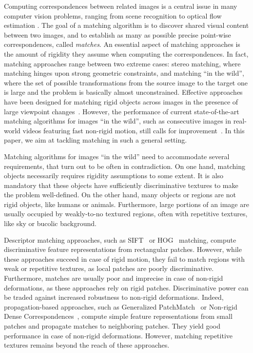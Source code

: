 \documentclass[twocolumn,natbib]{svjour3}
\begin{document}
Computing correspondences between related images is a central issue in many
computer vision problems, ranging from scene recognition to optical
flow estimation \citep{forsyth2011computer,Szeliski2010}. 
The goal of a matching algorithm is to discover shared visual content 
between two images, and 
to establish as many as possible precise point-wise correspondences, called \emph{matches}. 
An essential
aspect of matching approaches is the amount of rigidity they assume
when computing the correspondences.  In fact, matching
approaches range between two extreme cases:  stereo matching, where
matching hinges upon strong geometric constraints, 
and matching ``in the wild'', where the set of possible
transformations from the source image to the target one  is large and the
problem is basically almost unconstrained. 
Effective approaches have
been designed for matching rigid objects across images in the presence
of  large viewpoint changes~\citep{Lowe2004,Barnes2010,HaCohen2011}.
However, the performance of current state-of-the-art matching
algorithms for images ``in the wild'', such as consecutive images in
real-world videos featuring fast non-rigid motion, still calls for
improvement~\citep{mdpof,Chen2013}.   
In this paper, we aim at tackling matching in such a general setting. 


Matching algorithms for images ``in the wild'' need to accommodate several requirements, that turn out to be often in contradiction. On one hand,
matching objects necessarily requires rigidity assumptions to some extent. 
It is also mandatory that these objects have sufficiently discriminative textures to make the problem well-defined. 
On the other hand, 
many objects or regions are not rigid objects, like humans or animals. Furthermore, large portions of an image
are usually occupied by weakly-to-no textured regions, often with repetitive textures, like sky or bucolic background.

Descriptor matching approaches, such as SIFT~\citep{Lowe2004}
or HOG~\citep{Dalal2005,Bro11a} matching, compute discriminative feature representations from rectangular patches. 
However, while these approaches succeed in case of rigid motion, they fail to match regions with weak or repetitive textures, as local patches are poorly discriminative.
Furthermore, matches are usually poor and imprecise in case of non-rigid deformations, as these approaches rely on rigid patches.
Discriminative power can be traded against increased robustness to non-rigid deformations. Indeed, propagation-based approaches, 
such as Generalized PatchMatch~\citep{Barnes2010} or Non-rigid Dense Correspondences~\citep{HaCohen2011}, 
compute simple feature representations from small patches and propagate matches to neighboring patches. They yield good  performance in case of non-rigid deformations. However, matching repetitive textures remains beyond the reach of these approaches. 
\end{document}
